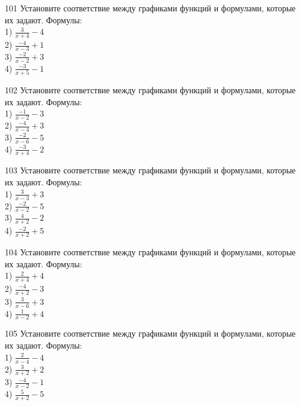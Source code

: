 \documentclass[4apaper]{article}
\begin{document}
\begin{taskBN}{101}
Установите соответствие между графиками функций и формулами, которые их задают. Формулы: \\1) $\frac{3}{x+4}-4$\\2) $\frac{-4}{x-3}+1$\\3) $\frac{-2}{x-2}+3$\\4) $\frac{-3}{x+5}-1$
\end{taskBN}

\begin{taskBN}{102}
Установите соответствие между графиками функций и формулами, которые их задают. Формулы: \\1) $\frac{-1}{x-2}-3$\\2) $\frac{-4}{x-4}+3$\\3) $\frac{-2}{x-6}-5$\\4) $\frac{-3}{x+4}-2$
\end{taskBN}

\begin{taskBN}{103}
Установите соответствие между графиками функций и формулами, которые их задают. Формулы: \\1) $\frac{3}{x-3}+3$\\2) $\frac{-2}{x-2}-5$\\3) $\frac{4}{x+2}-2$\\4) $\frac{-2}{x+2}+5$
\end{taskBN}

\begin{taskBN}{104}
Установите соответствие между графиками функций и формулами, которые их задают. Формулы: \\1) $\frac{2}{x+4}+4$\\2) $\frac{-4}{x+2}-3$\\3) $\frac{3}{x-6}+3$\\4) $\frac{1}{x-2}+4$
\end{taskBN}

\begin{taskBN}{105}
Установите соответствие между графиками функций и формулами, которые их задают. Формулы: \\1) $\frac{2}{x-4}-4$\\2) $\frac{3}{x+2}+2$\\3) $\frac{-4}{x-2}-1$\\4) $\frac{5}{x+2}-5$
\end{taskBN}
\end{document}
